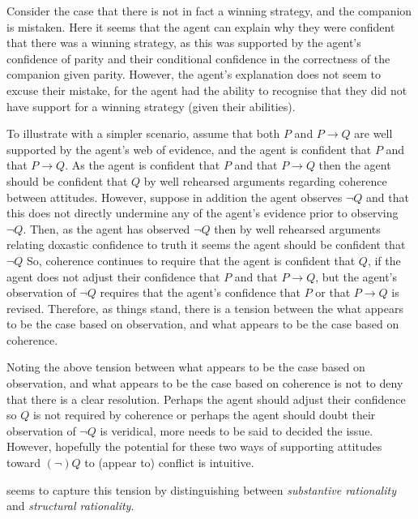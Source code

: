 \documentclass[10pt]{article}
\begin{document}
Consider the case that there is not in fact a winning strategy, and the companion is mistaken.
Here it seems that the agent can explain why they were confident that there was a winning strategy, as this was supported by the agent's confidence of parity and their conditional confidence in the correctness of the companion given parity.
However, the agent's explanation does not seem to excuse their mistake, for the agent had the ability to recognise that they did not have support for a winning strategy (given their abilities).

To illustrate with a simpler scenario, assume that both \(P\) and \(P \rightarrow Q\) are well supported by the agent's web of evidence, and the agent is confident that \(P\) and that \(P \rightarrow Q\).
As the agent is confident that \(P\) and that \(P \rightarrow Q\) then the agent should be confident that \(Q\) by well rehearsed arguments regarding coherence between attitudes.
However, suppose in addition the agent observes \(\lnot Q\) and that this does not directly undermine any of the agent's evidence prior to observing \(\lnot Q\).
Then, as the agent has observed \(\lnot Q\) then by well rehearsed arguments relating doxastic confidence to truth it seems the agent should be confident that \(\lnot Q\)
So, coherence continues to require that the agent is confident that \(Q\), if the agent does not adjust their confidence that \(P\) and that \(P \rightarrow Q\), but the agent's observation of \(\lnot Q\) requires that the agent's confidence that \(P\) or that \(P \rightarrow Q\) is revised.
Therefore, as things stand, there is a tension between the what appears to be the case based on observation, and what appears to be the case based on coherence.

Noting the above tension between what appears to be the case based on observation, and what appears to be the case based on coherence is not to deny that there is a clear resolution.
Perhaps the agent should  adjust their confidence so \(Q\) is not required by coherence or perhaps the agent should doubt their observation of \(\lnot Q\) is veridical, more needs to be said to decided the issue.
However, hopefully the potential for these two ways of supporting attitudes toward \((\lnot)Q\) to (appear to) conflict is intuitive.

\textcite{Fogal:2019aa} seems to capture this tension by distinguishing between \emph{substantive rationality} and \emph{structural rationality}.
\end{document}
